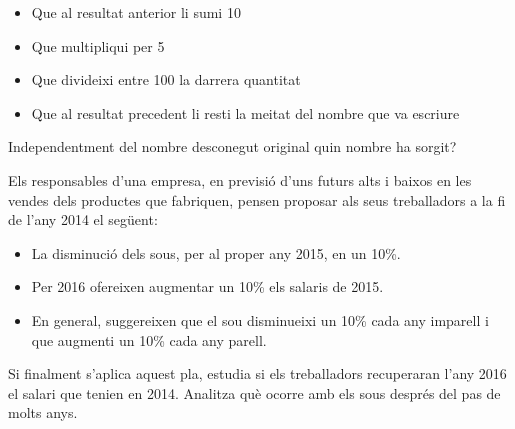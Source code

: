 \begin{activitats}
\begin{mylist}
\begin{itemize}
 \item Que al resultat anterior li sumi 10

 \item Que multipliqui per 5 

 \item  Que divideixi entre 100 la darrera quantitat 
 
 \item  Que al resultat precedent li resti la meitat del nombre que va escriure

\end{itemize} 

Independentment del nombre desconegut original quin nombre ha sorgit?


\exer  Els responsables d'una empresa, en previsió d'uns futurs alts i baixos en les vendes dels productes que fabriquen, pensen proposar als seus treballadors a la fi de l'any 2014 el següent: 
\begin{itemize}
\item  La disminució dels sous, per al proper any 2015, en un 10\%. 

\item  Per 2016 ofereixen augmentar un 10\% els salaris de 2015.

\item  En general, suggereixen que el sou disminueixi un 10\% cada any imparell i que augmenti un 10\% cada any parell. 
\end{itemize}

 Si finalment s'aplica aquest pla, estudia si els treballadors recuperaran l'any 2016 el salari que tenien en 2014. Analitza què ocorre amb els sous després del pas de molts anys.

\end{mylist}
\end{activitats}
